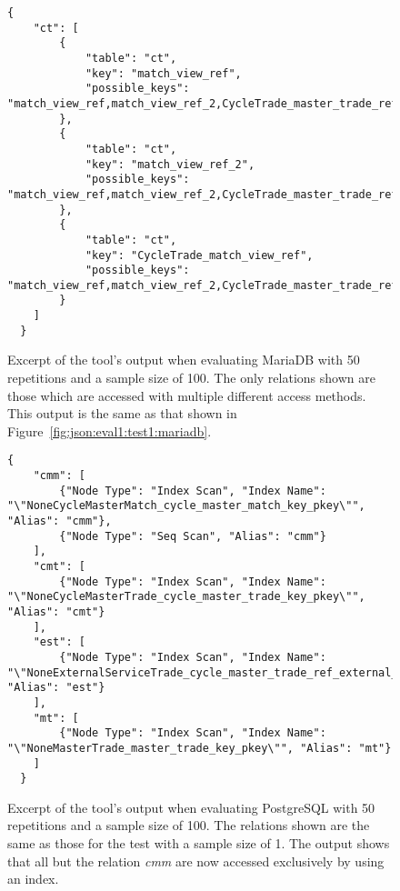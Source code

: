 \begin{figure}[ht]
  \begin{verbatim}
{
    "ct": [
        {
            "table": "ct",
            "key": "match_view_ref",
            "possible_keys": "match_view_ref,match_view_ref_2,CycleTrade_master_trade_ref,CycleTrade_trade_ref,CycleTrade_match_view_ref"
        },
        {
            "table": "ct",
            "key": "match_view_ref_2",
            "possible_keys": "match_view_ref,match_view_ref_2,CycleTrade_master_trade_ref,CycleTrade_trade_ref,CycleTrade_match_view_ref"
        },
        {
            "table": "ct",
            "key": "CycleTrade_match_view_ref",
            "possible_keys": "match_view_ref,match_view_ref_2,CycleTrade_master_trade_ref,CycleTrade_trade_ref,CycleTrade_match_view_ref"
        }
    ]
  }
\end{verbatim}
  \caption[Excerpt of the tool's output for MariaDB with 50 repetitions and a
  sample size of 100.]{Excerpt of the tool's output when evaluating MariaDB
    with 50 repetitions and a sample size of 100. The only relations shown are
    those which are accessed with multiple different access methods. This output is
    the same as that shown in
    Figure~\ref{fig:json:eval1:test1:mariadb}.}\label{fig:json:eval1:test3:mariadb}
\end{figure}

\begin{figure}[ht]
  \begin{verbatim}
{
    "cmm": [
        {"Node Type": "Index Scan", "Index Name": "\"NoneCycleMasterMatch_cycle_master_match_key_pkey\"", "Alias": "cmm"},
        {"Node Type": "Seq Scan", "Alias": "cmm"}
    ],
    "cmt": [
        {"Node Type": "Index Scan", "Index Name": "\"NoneCycleMasterTrade_cycle_master_trade_key_pkey\"", "Alias": "cmt"}
    ],
    "est": [
        {"Node Type": "Index Scan", "Index Name": "\"NoneExternalServiceTrade_cycle_master_trade_ref_external_servic\"", "Alias": "est"}
    ],
    "mt": [
        {"Node Type": "Index Scan", "Index Name": "\"NoneMasterTrade_master_trade_key_pkey\"", "Alias": "mt"}
    ]
  }
\end{verbatim}
  \caption[Excerpt of the tool's output for PostgreSQL with 50 repetitions and a
  sample size of 100.]{Excerpt of the tool's output when evaluating PostgreSQL
    with 50 repetitions and a sample size of 100. The relations shown are the
    same as those for the test with a sample size of 1. The output shows that
    all but the relation \textit{cmm} are now accessed exclusively by using an
    index.}\label{fig:json:eval1:test3:postgresql}
\end{figure}

